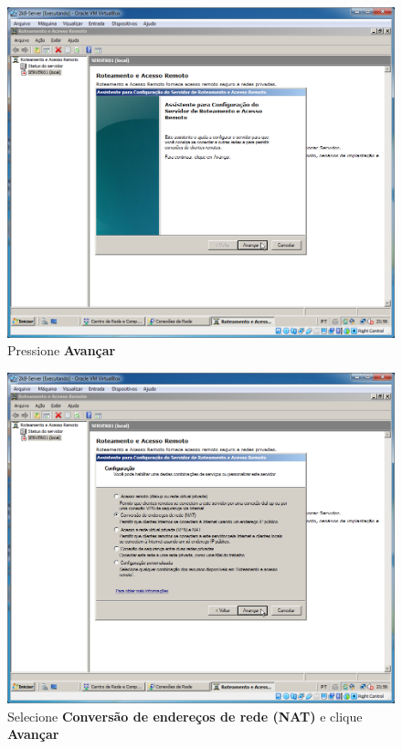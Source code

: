 \documentclass[10pt]{article}
\begin{document}
\begin{figure}[H]
    \centering
    \caption{Pressione \textbf{Avançar}}
    \label{fig:re030}
    \includegraphics[width=\linewidth]{images/rede_externa/re030.png}
\end{figure}
\begin{figure}[H]
    \centering
    \caption{Selecione \textbf{Conversão de endereços de rede (NAT)} e clique \textbf{Avançar}}
    \label{fig:re031}
    \includegraphics[width=\linewidth]{images/rede_externa/re031.png}
\end{figure}
\end{document}
